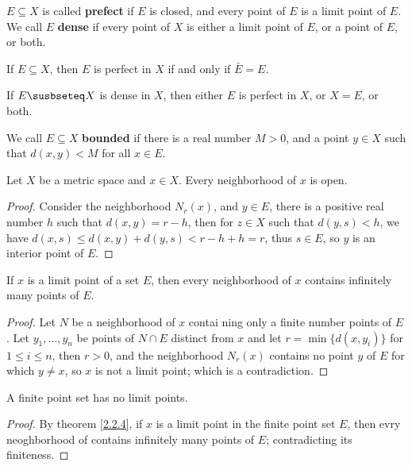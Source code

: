 \begin{definition}
    $E \subseteq X$ is called \textbf{prefect} if  $E$ is closed, and every point of $E$ is a limit 
    point of $E$. We call $E$ \textbf{dense} if  every point of  $X$ is either a limit point 
    of $E$, or a point of  $E$, or both.
\end{definition}

\begin{lemma}\label{2.2.2}
    If $E \subseteq X$, then  $E$ is perfect in  $X$ if and only if  $\bar{E}=E$.
\end{lemma}

\begin{lemma}\label{2.2.3}
    If $E \susbseteq X$ is dense in  $X$, then either  $E$ is perfect in $X$, or  
    $X=E$, or both.
\end{lemma}

\begin{definition}
    We call  $E \subseteq X$ \textbf{bounded} if there is a real number  $M>0$, and a point 
    $y \in X$ such that $d(x,y)<M$ for all $x \in E$.
\end{definition}

\begin{theorem}\label{2.2.3}
    Let $X$ be a metric space and  $x \in X$. Every neighborhood of  $x$ is open.
\end{theorem}
\begin{proof}
    Consider the neighborhood $N_r(x)$, and  $y \in E$, there is a positive real number  
    $h$ such that $d(x,y)=r-h$, then for $z \in X$ such that $d(y,s)<h$, we have 
    $d(x,s) \leq d(x,y)+d(y,s)<r-h+h=r$, thus $s \in E$, so $y$ is an interior point of $E$.
\end{proof}

\begin{theorem}\label{2.2.4}
    If $x$ is a limit point of a set  $E$, then every neighborhood of  $x$ contains infinitely many 
    points of  $E$.
\end{theorem}
\begin{proof}
    Let $N$ be a neighborhood of  $x$ contai ning only a finite number points of $E$. Let 
    $y_1, \dots, y_n$ be points of $N \cap E$ distinct from  $x$ and let $r=\min\{d(x,y_i)\}$ 
    for  $1 \leq i \leq n$, then  $r>0$, and the neighborhood  $N_r(x)$ contains no point  $y$ 
    of  $E$ for which $y \neq x$, so $x$ is not a limit point; which is a contradiction.
\end{proof}

\begin{corollary}
    A finite point set has no limit points.
\end{corollary}
\begin{proof}
    By theorem \ref{2.2.4}, if $x$ is a limit point in the finite point set $E$, then 
    evry neoghborhood of contains infinitely many points of $E$; contradicting its finiteness.
\end{proof}

